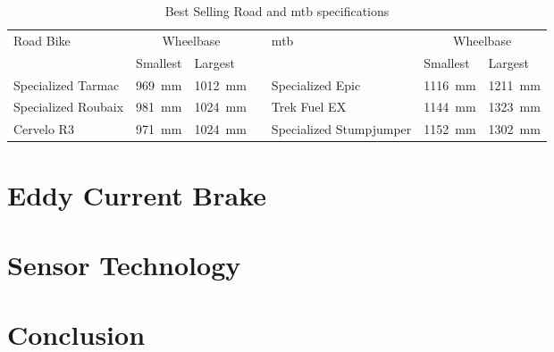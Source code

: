 \begin{table}[ht]
	\renewcommand{\arraystretch}{1.2}
	\centering
	\caption{Best Selling Road and \ac{mtb} specifications \citep{Geometry:2022}}
	\begin{tabularx}{\textwidth}{p{2.6cm} X Xp{0.05cm} p{2.6cm} X X}
		\toprule
		Road Bike           & \multicolumn{2}{c}{Wheelbase} &                         & \ac{mtb} & \multicolumn{2}{c}{Wheelbase}                                                     \\
		                    & Smallest                      & Largest                 &          &                               & Smallest                & Largest                 \\
		\midrule
		Specialized Tarmac  & \SI{969}{\milli\meter}        & \SI{1012}{\milli\meter} &          & Specialized Epic              & \SI{1116}{\milli\meter} & \SI{1211}{\milli\meter} \\
		Specialized Roubaix & \SI{981}{\milli\meter}        & \SI{1024}{\milli\meter} &          & Trek Fuel EX                  & \SI{1144}{\milli\meter} & \SI{1323}{\milli\meter} \\
		Cervelo R3          & \SI{971}{\milli\meter}        & \SI{1024}{\milli\meter} &          & Specialized Stumpjumper       & \SI{1152}{\milli\meter} & \SI{1302}{\milli\meter} \\
		\bottomrule
	\end{tabularx}
	\label{tab:bikes}
\end{table}

\section{Eddy Current Brake}
\section{Sensor Technology}
\section{Conclusion}
